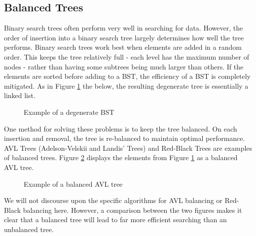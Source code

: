 \subsection*{Balanced Trees}
Binary search trees often perform very well in searching for data.
However, the order of insertion into a binary search tree largely determines how well the tree performs.
Binary search trees work best when elements are added in a random order.
This keeps the tree relatively full - each level has the maximum number of nodes -  rather than having some subtrees being much larger than others.
If the elements are sorted before adding to a BST, the efficiency of a BST is completely mitigated.
As in Figure \ref{Degenerate Tree} the below, the resulting degenerate tree is essentially a linked list.
\begin{figure}[\h]
\caption{Example of a degenerate BST}
\label{Degenerate Tree}
\end{figure}



One method for solving these problems is to keep the tree balanced.
On each insertion and removal, the tree is re-balanced to maintain optimal performance.
AVL Trees (Adelson-Velskii and Landis' Trees) and Red-Black Trees are examples of balanced trees.
Figure \ref{AVL tree} displays the elements from Figure \ref{Degenerate Tree} as a balanced AVL tree.

\begin{figure}[\h]
\caption{Example of a balanced AVL tree}
\label{AVL tree}
\end{figure}
We will not discourse upon the specific algorithms for AVL balancing or Red-Black balancing here.
However, a comparison between the two figures makes it clear that a balanced tree will lead to far more efficient searching than an unbalanced tree.
